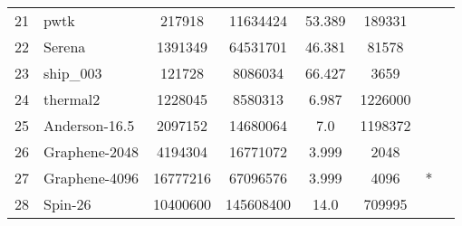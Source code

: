 \begin{tabular}{|l|l|c|c|c|c|c|c|}
{21}	& {pwtk}	& {217918}	& {11634424}	& {53.389}	& {189331}	& {} &	\\
{22}	& {Serena}	& {1391349}	& {64531701}	& {46.381}	& {81578}	& {} &	\\
{23}	& {ship\_003}	& {121728}	& {8086034}	& {66.427}	& {3659}	& {} &	\\
{24}	& {thermal2}	& {1228045}	& {8580313}	& {6.987}	& {1226000}	& {} &	\\
\midrule
{25}	& {Anderson-16.5}	& {2097152}	& {14680064}	& {7.0}	& {1198372}	& {} & \multirow{4}{*}{\rotatebox[origin=c]{90}{ESSEX}}	\\
{26}	& {Graphene-2048}	& {4194304}	& {16771072}	& {3.999}	& {2048}	& {} &	\\
{27}	& {Graphene-4096}	& {16777216}	& {67096576}	& {3.999}	& {4096}	& {*} &	\\
{28}	& {Spin-26}	& {10400600}	& {145608400}	& {14.0}	& {709995}	& {} &	\\
\bottomrule
\end{tabular}


